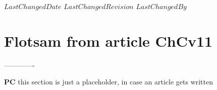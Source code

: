 {$LastChangedDate$}
{$LastChangedRevision$} {$LastChangedBy$}

\section{Flotsam from article ChCv11}
\label{sec:flotsam}


-------------

													\toCB
{\bf PC}{ this section is just a placeholder, in case an article gets written}
